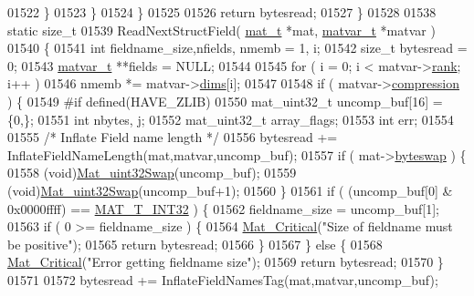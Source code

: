 \begin{DoxyCode}
{{{{{{{{{{{01522             \}
01523         \}
01524     \}
01525 
01526     \textcolor{keywordflow}{return} bytesread;
01527 \}
01528 
01538 \textcolor{keyword}{static} \textcolor{keywordtype}{size\_t}
01539 ReadNextStructField( \hyperlink{struct__mat__t}{mat\_t} *mat, \hyperlink{group___m_a_t_structmatvar__t}{matvar\_t} *matvar )
01540 \{
01541     \textcolor{keywordtype}{int} fieldname\_size,nfields, nmemb = 1, i;
01542     \textcolor{keywordtype}{size\_t} bytesread = 0;
01543     \hyperlink{group___m_a_t_structmatvar__t}{matvar\_t} **fields = NULL;
01544 
01545     \textcolor{keywordflow}{for} ( i = 0; i < matvar->\hyperlink{group___m_a_t_a84ba70c96ded13cc555fa75b768d9921}{rank}; i++ )
01546         nmemb *= matvar->\hyperlink{group___m_a_t_a8e01234e1c862ce3472bb37f5a09b92c}{dims}[i];
01547 
01548     if ( matvar->\hyperlink{group___m_a_t_aeef0466048621cb2c959ba7f6c774d06}{compression} ) \{
01549 \textcolor{preprocessor}{#if defined(HAVE\_ZLIB)}
01550         mat\_uint32\_t uncomp\_buf[16] = \{0,\};
01551         \textcolor{keywordtype}{int} nbytes, j;
01552         mat\_uint32\_t array\_flags;
01553         \textcolor{keywordtype}{int} err;
01554 
01555         \textcolor{comment}{/* Inflate Field name length */}
01556         bytesread += InflateFieldNameLength(mat,matvar,uncomp\_buf);
01557         \textcolor{keywordflow}{if} ( mat->\hyperlink{struct__mat__t_a99d207977af5e04941ace56d71817a40}{byteswap} ) \{
01558             (void)\hyperlink{endian_8c_a8cb0d0750e2eaf9840d95db531934f4f}{Mat\_uint32Swap}(uncomp\_buf);
01559             (void)\hyperlink{endian_8c_a8cb0d0750e2eaf9840d95db531934f4f}{Mat\_uint32Swap}(uncomp\_buf+1);
01560         \}
01561         \textcolor{keywordflow}{if} ( (uncomp\_buf[0] & 0x0000ffff) == \hyperlink{group___m_a_t_ggacf7b3b879282b7ab3a51190e49bf3453a83e06a68320726c6572bfbb9f3addb1d}{MAT\_T\_INT32} ) \{
01562             fieldname\_size = uncomp\_buf[1];
01563             \textcolor{keywordflow}{if} ( 0 >= fieldname\_size ) \{
01564                 \hyperlink{group__mat__util_gaf51f2bfbb5580f575e4dd79757e2b80c}{Mat\_Critical}(\textcolor{stringliteral}{"Size of fieldname must be positive"});
01565                 \textcolor{keywordflow}{return} bytesread;
01566             \}
01567         \} \textcolor{keywordflow}{else} \{
01568             \hyperlink{group__mat__util_gaf51f2bfbb5580f575e4dd79757e2b80c}{Mat\_Critical}(\textcolor{stringliteral}{"Error getting fieldname size"});
01569             \textcolor{keywordflow}{return} bytesread;
01570         \}
01571 
01572         bytesread += InflateFieldNamesTag(mat,matvar,uncomp\_buf);
}}}}}}}}}}}
\end{DoxyCode}
